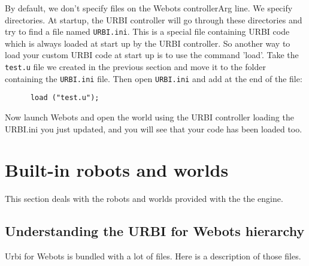 By default, we don't specify files on the Webots controllerArg
line. We specify directories.  At startup, the URBI controller will go
through these directories and try to find a file named
\nolinkurl{URBI.ini}. This is a special file containing URBI code
which is always loaded at start up by the URBI controller. So another
way to load your custom URBI code at start up is to use the command
'load'.  Take the \nolinkurl{test.u} file we created in the previous
section and move it to the folder containing the \nolinkurl{URBI.ini}
file. Then open \nolinkurl{URBI.ini} and add at the end of the file:


\begin{lstlisting}
      load ("test.u");
\end{lstlisting}
Now launch Webots and open the world using the URBI controller loading
the URBI.ini you just updated, and you will see that your code has
been loaded too.


\section{Built-{}in robots and worlds}
\label{webots.builtin}%

This section deals with the robots and worlds provided with the the
engine.


\subsection{Understanding the URBI for Webots hierarchy}
\label{webots.builtin.hierarchy}%

 Urbi for Webots is bundled with a lot of files. Here is a description of
those files.

